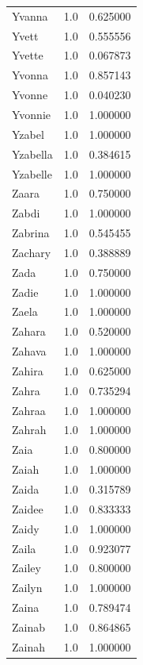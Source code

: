 \documentclass[
  letterpaper,
  DIV=11,
  numbers=noendperiod]{scrreprt}
\begin{document}
\begin{tabular}{lrr}
Yvanna          &   1.0 &   0.625000 \\
Yvett           &   1.0 &   0.555556 \\
Yvette          &   1.0 &   0.067873 \\
Yvonna          &   1.0 &   0.857143 \\
Yvonne          &   1.0 &   0.040230 \\
Yvonnie         &   1.0 &   1.000000 \\
Yzabel          &   1.0 &   1.000000 \\
Yzabella        &   1.0 &   0.384615 \\
Yzabelle        &   1.0 &   1.000000 \\
Zaara           &   1.0 &   0.750000 \\
Zabdi           &   1.0 &   1.000000 \\
Zabrina         &   1.0 &   0.545455 \\
Zachary         &   1.0 &   0.388889 \\
Zada            &   1.0 &   0.750000 \\
Zadie           &   1.0 &   1.000000 \\
Zaela           &   1.0 &   1.000000 \\
Zahara          &   1.0 &   0.520000 \\
Zahava          &   1.0 &   1.000000 \\
Zahira          &   1.0 &   0.625000 \\
Zahra           &   1.0 &   0.735294 \\
Zahraa          &   1.0 &   1.000000 \\
Zahrah          &   1.0 &   1.000000 \\
Zaia            &   1.0 &   0.800000 \\
Zaiah           &   1.0 &   1.000000 \\
Zaida           &   1.0 &   0.315789 \\
Zaidee          &   1.0 &   0.833333 \\
Zaidy           &   1.0 &   1.000000 \\
Zaila           &   1.0 &   0.923077 \\
Zailey          &   1.0 &   0.800000 \\
Zailyn          &   1.0 &   1.000000 \\
Zaina           &   1.0 &   0.789474 \\
Zainab          &   1.0 &   0.864865 \\
Zainah          &   1.0 &   1.000000 \\

\end{tabular}
\end{document}
